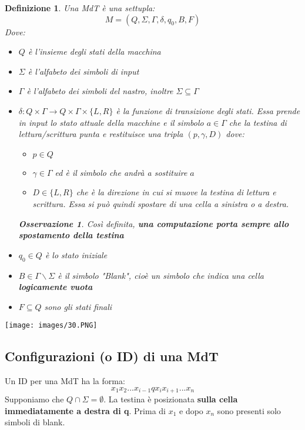 \documentclass[12pt]{article}
\newtheorem{Definizione}{Definizione}[subsection]
\newtheorem{Osservazione}{Osservazione}[subsection]
\begin{document}
\begin{Definizione}
    Una MdT è una settupla:
    $$M = (Q, \Sigma, \Gamma, \delta, q_0, B, F)$$
    Dove:
    \begin{itemize}
        \item $Q$ è l'insieme degli stati della macchina
        \item $\Sigma$ è l'alfabeto dei simboli di input
        \item $\Gamma$ è l'alfabeto dei simboli del nastro, inoltre $\Sigma \subseteq \Gamma$
        \item $\delta: Q \times \Gamma \rightarrow Q \times \Gamma \times \{L, R\}$ è la funzione di transizione degli stati. Essa prende in input lo stato attuale della macchine e il simbolo $a \in \Gamma$ che la testina di lettura/scrittura punta e restituisce una tripla $(p, \gamma, D)$ dove:
        \begin{itemize}
            \item $p \in Q$
            \item $\gamma \in \Gamma$ ed è il simbolo che andrà a sostituire $a$
            \item $D \in \{L, R\}$ che è la direzione in cui si muove la testina di lettura e scrittura. Essa si può quindi spostare di una cella a sinistra o a destra.
        \end{itemize}
        \begin{Osservazione}
            Così definita, \textbf{una computazione porta sempre allo spostamento della testina}
        \end{Osservazione}
        \item $q_0 \in Q$ è lo stato iniziale
        \item $B \in \Gamma \backslash \Sigma$ è il simbolo "Blank", cioè un simbolo che indica una cella \textbf{logicamente vuota}
        \item $F \subseteq Q$ sono gli stati finali
    \end{itemize}
\end{Definizione}
\begin{center}
    \texttt{[image: images/30.PNG]}
\end{center}


\subsection{Configurazioni (o ID) di una MdT}
Un ID per una MdT ha la forma:
$$x_1x_2...x_{i-1}qx_ix_{i+1}...x_n$$
Supponiamo che $Q \cap \Sigma = \emptyset$. \newline
La testina è posizionata \textbf{sulla cella immediatamente a destra di q}. Prima di $x_1$ e dopo $x_n$ sono presenti solo simboli di blank.
\end{document}
